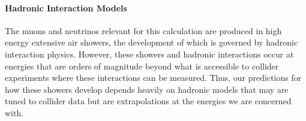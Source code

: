 \paragraph{Hadronic Interaction Models}
The muons and neutrinos relevant for this calculation are produced in high energy extensive air showers, the development of which is governed by hadronic interaction physics.
However, these showers and hadronic interactions occur at energies that are orders of magnitude beyond what is accessible to collider experiments where these interactions can be measured.
Thus, our predictions for how these showers develop depends heavily on hadronic models that may are tuned to collider data but are extrapolations at the energies we are concerned with.

\begin{figure}[h!]
	\centering
	\\[2ex]
\end{figure}
